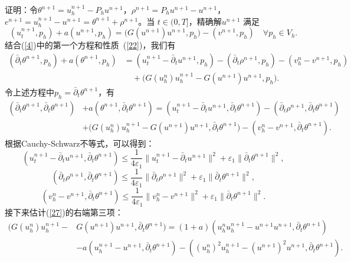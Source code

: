 \documentclass[twoside,UTF8]{nputhesis}
\begin{document}
证明：令$\theta^{n+1}=u^{n+1}_h-P_hu^{n+1}$，$\rho^{n+1}=P_hu^{n+1}-u^{n+1}$，$e^{n+1}=u^{n+1}_h-u^{n+1}=\theta^{n+1}+\rho^{n+1}$。当 $t\in(0,T]$，精确解$u^{n+1}$ 满足
\begin{equation*}
(u^{n+1}_t,p_h)+a(u^{n+1},p_h)=\Big(G(u^{n+1})u^{n+1},p_h\Big)-(v^{n+1},p_h)\quad\forall p_h\in V_h.
\label{25}
\end{equation*}
结合(\ref{4})中的第一个方程和性质~(\ref{22})，我们有
\begin{equation}
\begin{split}
(\bar{\partial}_t\theta^{n+1},p_h)+a(\theta^{n+1},p_h)&=(u_t^{n+1}-\bar{\partial}_tu^{n+1},p_h)-(\bar{\partial}_t\rho^{n+1},p_h)-(v_h^{n}-v^{n+1},p_h)\\
&\quad+\Big(G(u^n_h)u^{n+1}_h-G(u^{n+1})u^{n+1},p_h\Big).
\label{26}
\end{split}
\end{equation}
令上述方程中$p_h=\bar{\partial}_t\theta^{n+1}$，有
\begin{equation}
\begin{split}
(\bar{\partial}_t\theta^{n+1},\bar{\partial}_t\theta^{n+1})&+a(\theta^{n+1},\bar{\partial}_t\theta^{n+1})=(u_t^{n+1}-\bar{\partial}_tu^{n+1},\bar{\partial}_t\theta^{n+1})
-(\bar{\partial}_t\rho^{n+1},\bar{\partial}_t\theta^{n+1})\\
&+\Big(G(u^n_h)u^{n+1}_h-G(u^{n+1})u^{n+1},\bar{\partial}_t\theta^{n+1}\Big)-(v_h^n-v^{n+1},\bar{\partial}_t\theta^{n+1}).
\label{27}
\end{split}
\end{equation}
根据Cauchy-Schwarz不等式，可以得到：
\begin{equation}
(u_t^{n+1}-\bar{\partial}_tu^{n+1},\bar{\partial}_t\theta^{n+1})\leq \frac{1}{4\varepsilon_1}\| u_t^{n+1}-\bar{\partial}_tu^{n+1}\|^2+\varepsilon_1\| \bar{\partial}_t\theta^{n+1}
\|^2,
\label{28}
\end{equation}
\begin{equation}
(\bar{\partial}_t\rho^{n+1},\bar{\partial}_t\theta^{n+1})\leq \frac{1}{4\varepsilon_1}\| \bar{\partial}_t\rho^{n+1}\|^2+\varepsilon_1\| \bar{\partial}_t\theta^{n+1}\|^2,
\label{29}
\end{equation}
\begin{equation}
(v_h^n-v^{n+1},\bar{\partial}_t\theta^{n+1})\leq \frac{1}{4\varepsilon_1}\| v_h^n-v^{n+1}\|^2+\varepsilon_1\| \bar{\partial}_t\theta^{n+1}
\|^2.
\label{30}
\end{equation}
接下来估计(\ref{27})的右端第三项：
\begin{equation}
\begin{split}
\Big(G(u^n_h)u^{n+1}_h-&G(u^{n+1})u^{n+1},\bar{\partial}_t\theta^{n+1} \Big)=(1+a)\left(u^n_hu^{n+1}_h-u^{n+1}u^{n+1},\bar{\partial}_t\theta^{n+1} \right)\\
&-a\left(u^{n+1}_h-u^{n+1},\bar{\partial}_t\theta^{n+1} \right)-\left((u^n_h)^2u^{n+1}_h-(u^{n+1})^2u^{n+1},\bar{\partial}_t\theta^{n+1} \right).
\label{31}
\end{split}
\end{equation}
\end{document}

